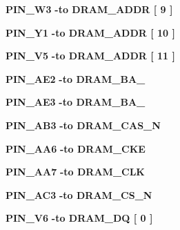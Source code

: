 \begin{DoxyCompactItemize}
\item 
{\bf P\+I\+N\+\_\+\+W3} {\bfseries \textcolor{vhdlchar}{-\/}\textcolor{keywordflow}{to}\textcolor{vhdlchar}{ }\textcolor{vhdlchar}{D\+R\+A\+M\+\_\+\+A\+D\+DR}\textcolor{vhdlchar}{ }\textcolor{vhdlchar}{[}\textcolor{vhdlchar}{ } \textcolor{vhdldigit}{9} \textcolor{vhdlchar}{ }\textcolor{vhdlchar}{]}\textcolor{vhdlchar}{ }} 
\item 
{\bf P\+I\+N\+\_\+\+Y1} {\bfseries \textcolor{vhdlchar}{-\/}\textcolor{keywordflow}{to}\textcolor{vhdlchar}{ }\textcolor{vhdlchar}{D\+R\+A\+M\+\_\+\+A\+D\+DR}\textcolor{vhdlchar}{ }\textcolor{vhdlchar}{[}\textcolor{vhdlchar}{ } \textcolor{vhdldigit}{10} \textcolor{vhdlchar}{ }\textcolor{vhdlchar}{]}\textcolor{vhdlchar}{ }} 
\item 
{\bf P\+I\+N\+\_\+\+V5} {\bfseries \textcolor{vhdlchar}{-\/}\textcolor{keywordflow}{to}\textcolor{vhdlchar}{ }\textcolor{vhdlchar}{D\+R\+A\+M\+\_\+\+A\+D\+DR}\textcolor{vhdlchar}{ }\textcolor{vhdlchar}{[}\textcolor{vhdlchar}{ } \textcolor{vhdldigit}{11} \textcolor{vhdlchar}{ }\textcolor{vhdlchar}{]}\textcolor{vhdlchar}{ }} 
\item 
{\bf P\+I\+N\+\_\+\+A\+E2} {\bfseries \textcolor{vhdlchar}{-\/}\textcolor{keywordflow}{to}\textcolor{vhdlchar}{ }\textcolor{vhdlchar}{D\+R\+A\+M\+\_\+\+B\+A\+\_}\textcolor{vhdlchar}{ }} 
\item 
{\bf P\+I\+N\+\_\+\+A\+E3} {\bfseries \textcolor{vhdlchar}{-\/}\textcolor{keywordflow}{to}\textcolor{vhdlchar}{ }\textcolor{vhdlchar}{D\+R\+A\+M\+\_\+\+B\+A\+\_}\textcolor{vhdlchar}{ }} 
\item 
{\bf P\+I\+N\+\_\+\+A\+B3} {\bfseries \textcolor{vhdlchar}{-\/}\textcolor{keywordflow}{to}\textcolor{vhdlchar}{ }\textcolor{vhdlchar}{D\+R\+A\+M\+\_\+\+C\+A\+S\+\_\+N}\textcolor{vhdlchar}{ }} 
\item 
{\bf P\+I\+N\+\_\+\+A\+A6} {\bfseries \textcolor{vhdlchar}{-\/}\textcolor{keywordflow}{to}\textcolor{vhdlchar}{ }\textcolor{vhdlchar}{D\+R\+A\+M\+\_\+\+C\+KE}\textcolor{vhdlchar}{ }} 
\item 
{\bf P\+I\+N\+\_\+\+A\+A7} {\bfseries \textcolor{vhdlchar}{-\/}\textcolor{keywordflow}{to}\textcolor{vhdlchar}{ }\textcolor{vhdlchar}{D\+R\+A\+M\+\_\+\+C\+LK}\textcolor{vhdlchar}{ }} 
\item 
{\bf P\+I\+N\+\_\+\+A\+C3} {\bfseries \textcolor{vhdlchar}{-\/}\textcolor{keywordflow}{to}\textcolor{vhdlchar}{ }\textcolor{vhdlchar}{D\+R\+A\+M\+\_\+\+C\+S\+\_\+N}\textcolor{vhdlchar}{ }} 
\item 
{\bf P\+I\+N\+\_\+\+V6} {\bfseries \textcolor{vhdlchar}{-\/}\textcolor{keywordflow}{to}\textcolor{vhdlchar}{ }\textcolor{vhdlchar}{D\+R\+A\+M\+\_\+\+DQ}\textcolor{vhdlchar}{ }\textcolor{vhdlchar}{[}\textcolor{vhdlchar}{ } \textcolor{vhdldigit}{0} \textcolor{vhdlchar}{ }\textcolor{vhdlchar}{]}\textcolor{vhdlchar}{ }} 

\end{DoxyCompactItemize}
